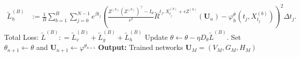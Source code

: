 \documentclass[twoside,11pt]{article}
\newcommand{\1}{\mathbf{1}}
\numberwithin{equation}{section}
\begin{document}
\begin{algorithm}
\begin{algorithmic}[1]
\begin{align*}
        \tilde L^{(B)}_h &:= \frac{1}{B}\sum_{b = 1}^{B}\sum_{j = 0}^{N-1} e^{\beta t_j}\left( \frac{Z^{(b)}(Z^{(b)})^{\top} - I_d}{\epsilon^2}\tilde R^{t_j,X_{t_j}^{(b)}+\epsilon Z^{(b)}}(\mathbf{U}_n) - \varphi^{\theta}_h(t_j,X_{t_j}^{(b)})\right)^2 \Delta t_j.
        \end{align*}
        \State Total Loss: $ \tilde L^{(B)}: = \tilde L^{(B)}_v+ \tilde L^{(B)}_g+ \tilde L^{(B)}_h$
        \State Update $ \theta \gets \theta - \eta D_{\theta}\tilde L^{(B)}$.
    \EndFor
    \State Set $\theta_{n+1} \gets \theta$ and $\mathbf{U}_{n+1} \gets \varphi^{\theta_{n+1}}$
\EndFor
\State \textbf{Output:} Trained networks $\mathbf{U}_{M} = (V_{M}, G_{M}, H_{M})$
\end{algorithmic}
\end{algorithm}
\end{document}
